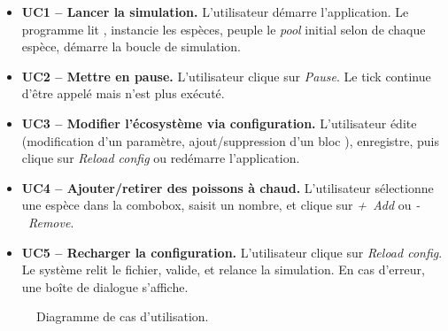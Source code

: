 \begin{itemize}[leftmargin=*]
  \item \textbf{UC1 -- Lancer la simulation.} L'utilisateur
    démarre l'application. Le programme lit
    , instancie les espèces, peuple le
    \emph{pool} initial selon  de chaque
    espèce, démarre la boucle de simulation.

  \item \textbf{UC2 -- Mettre en pause.} L'utilisateur clique sur
    \emph{Pause}. Le tick continue d'être appelé mais
     n'est plus exécuté.

  \item \textbf{UC3 -- Modifier l'écosystème via configuration.}
    L'utilisateur édite  (modification d'un
    paramètre, ajout/suppression d'un bloc \code{[[species]]}),
    enregistre, puis clique sur \emph{Reload config} ou redémarre
    l'application.

  \item \textbf{UC4 -- Ajouter/retirer des poissons à chaud.}
    L'utilisateur sélectionne une espèce dans la combobox,
    saisit un nombre, et clique sur \emph{+~Add} ou
    \emph{-~Remove}.

  \item \textbf{UC5 -- Recharger la configuration.} L'utilisateur
    clique sur \emph{Reload config}. Le système relit le fichier,
    valide, et relance la simulation. En cas d'erreur, une boîte
    de dialogue s'affiche.
\end{itemize}

\begin{figure}[h!]
\centering
{}
\caption{Diagramme de cas d'utilisation.}
\label{fig:usecases}
\end{figure}

